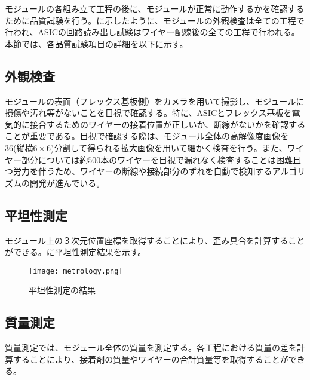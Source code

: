 モジュールの各組み立て工程の後に、モジュールが正常に動作するかを確認するために品質試験を行う。に示したように、モジュールの外観検査は全ての工程で行われ、ASICの回路読み出し試験はワイヤー配線後の全ての工程で行われる。本節では、各品質試験項目の詳細を以下に示す。



\subsection{外観検査}
\label{sec:visualinsp}
モジュールの表面（フレックス基板側）をカメラを用いて撮影し、モジュールに損傷や汚れ等がないことを目視で確認する。特に、ASICとフレックス基板を電気的に接合するためのワイヤーの接着位置が正しいか、断線がないかを確認することが重要である。目視で確認する際は、モジュール全体の高解像度画像を36(縦横$6\times6$)分割して得られる拡大画像を用いて細かく検査を行う。また、ワイヤー部分については約$500$本のワイヤーを目視で漏れなく検査することは困難且つ労力を伴うため、ワイヤーの断線や接続部分のずれを自動で検知するアルゴリズムの開発が進んでいる。



\subsection{平坦性測定}
\label{sec:metrology}
モジュール上の３次元位置座標を取得することにより、歪み具合を計算することができる。に平坦性測定結果を示す。

\begin{figure}[tbp]
  \centering
  \texttt{[image: metrology.png]}
  \caption[平坦性測定の結果]{平坦性測定の結果 }
  \label{fig:metrology}
\end{figure}


\subsection{質量測定}
\label{sec:mass}
質量測定では、モジュール全体の質量を測定する。各工程における質量の差を計算することにより、接着剤の質量やワイヤーの合計質量等を取得することができる。


